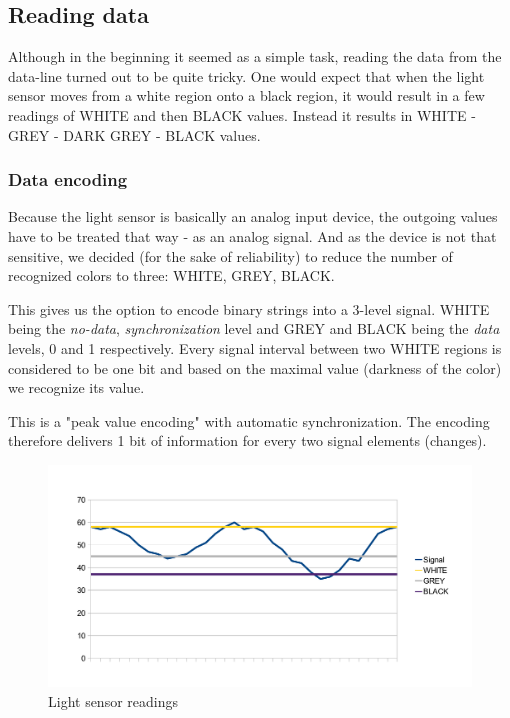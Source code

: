 \subsection{Reading data}
Although in the beginning it seemed as a simple task, reading the data
from the data-line turned out to be quite tricky. One would expect that
when the light sensor moves from a white region onto a black region,
it would result in a few readings of WHITE and then BLACK values. Instead
it results in WHITE - GREY - DARK GREY - BLACK values.

\subsubsection{Data encoding}
Because the light sensor is basically an analog input device, the outgoing
values have to be treated that way - as an analog signal. And as the device
is not that sensitive, we decided (for the sake of reliability) to reduce
the number of recognized colors to three: WHITE, GREY, BLACK.

This gives us the option to encode binary strings into a 3-level signal.
WHITE being the \textit{no-data}, \textit{synchronization} level and GREY
and BLACK being the \textit{data} levels, 0 and 1 respectively. Every
signal interval between two WHITE regions is considered to be one bit and
based on the maximal value (darkness of the color) we recognize its value.

This is a "peak value encoding" with automatic synchronization.
The encoding therefore delivers 1 bit of information for every two signal
elements (changes).

\begin{figure}[h]
\includegraphics[width=1.0\linewidth]{light_signal.pdf}
\caption{Light sensor readings}
\end{figure}

